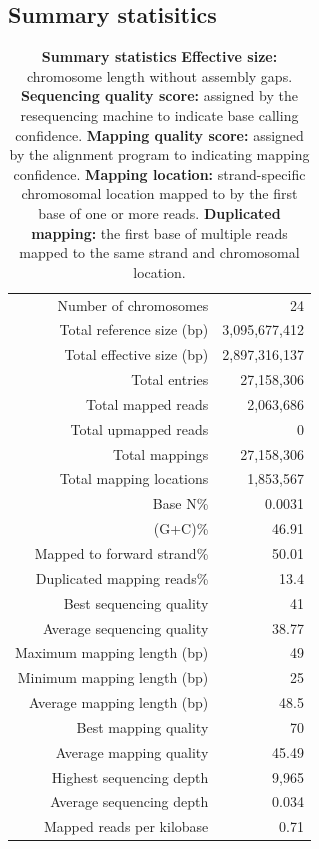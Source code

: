 \documentclass{article}
\begin{document}
\subsection{Summary statisitics}
\begin{table}
\begin{tabular}{|r|r|}
  \hline
  \rowcolor[gray]{0.9} \hline
Number of chromosomes & 24 \\ 
  Total reference size (bp) & 3,095,677,412 \\ 
   \rowcolor[gray]{0.9}Total effective size (bp) & 2,897,316,137 \\ 
  Total entries & 27,158,306 \\ 
   \rowcolor[gray]{0.9}Total mapped reads & 2,063,686 \\ 
  Total upmapped reads & 0 \\ 
   \rowcolor[gray]{0.9}Total mappings & 27,158,306 \\ 
  Total mapping locations & 1,853,567 \\ 
   \rowcolor[gray]{0.9}Base N\% & 0.0031 \\ 
  (G+C)\% & 46.91 \\ 
   \rowcolor[gray]{0.9}Mapped to forward strand\% & 50.01 \\ 
  Duplicated mapping reads\% & 13.4 \\ 
   \rowcolor[gray]{0.9}Best sequencing quality & 41 \\ 
  Average sequencing quality & 38.77 \\ 
   \rowcolor[gray]{0.9}Maximum mapping length (bp) & 49 \\ 
  Minimum mapping length (bp) & 25 \\ 
   \rowcolor[gray]{0.9}Average mapping length (bp) & 48.5 \\ 
  Best mapping quality & 70 \\ 
   \rowcolor[gray]{0.9}Average mapping quality & 45.49 \\ 
  Highest sequencing depth & 9,965 \\ 
   \rowcolor[gray]{0.9}Average sequencing depth & 0.034 \\ 
  Mapped reads per kilobase & 0.71 \\ 
   \hline
\end{tabular}\caption{\textbf{Summary statistics}
\newline
\textbf{Effective size:} chromosome length without assembly gaps.
\newline
\textbf{Sequencing quality score:} assigned by the resequencing machine to indicate base calling confidence. 
\newline
\textbf{Mapping quality score:}  assigned by the alignment program to indicating mapping confidence.
\newline
\textbf{Mapping location:} strand-specific chromosomal location mapped to by the first base of one or more reads.
\newline
\textbf{Duplicated mapping:} the first base of multiple reads mapped to the same strand and chromosomal location.
}
\end{table}
\end{document}
